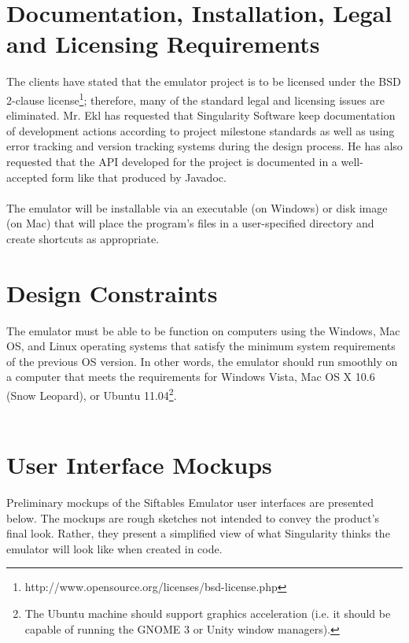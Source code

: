 \documentclass[12pt]{article}
\begin{document}
\section{Documentation, Installation, Legal and Licensing Requirements}
The clients have stated that the emulator project is to be licensed under the BSD 2-clause license\footnote{http://www.opensource.org/licenses/bsd-license.php}; therefore, many of the standard legal and licensing issues are eliminated. Mr. Ekl has requested that Singularity Software keep documentation of development actions according to project milestone standards as well as using error tracking and version tracking systems during the design process. He has also requested that the API developed for the project is documented in a well-accepted form like that produced by Javadoc.\\\\
The emulator will be installable via an executable (on \gls{Windows}) or disk image (on \gls{Mac}) that will place the program's files in a user-specified directory and create shortcuts as appropriate.

\section{Design Constraints}
The emulator must be able to be function on computers using the \gls{Windows}, \gls{Mac} OS, and \gls{Linux} operating systems that satisfy the minimum system requirements of the previous OS version. In other words, the emulator should run smoothly on a computer that meets the requirements for \gls{Windows} Vista, \gls{Mac} OS X 10.6 (Snow Leopard), or Ubuntu 11.04\footnote{The Ubuntu machine should support graphics acceleration (i.e. it should be capable of running the GNOME 3 or Unity window managers).}.\\\\

\section{User Interface Mockups}
Preliminary mockups of the Siftables Emulator user interfaces are presented below. The mockups are rough sketches not intended to convey the product's final look. Rather, they present a simplified view of what Singularity thinks the emulator will look like when created in code.
\end{document}

